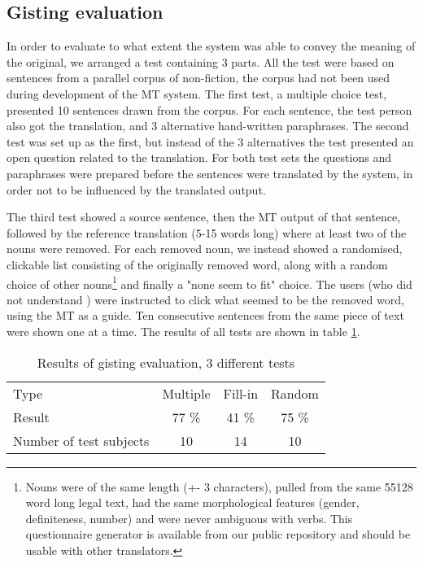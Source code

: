 \documentclass{book}
\begin{document}
\subsection{Gisting evaluation}
  
In order to evaluate to what extent the system was able to convey the
meaning of the original, we arranged a test containing 3 parts. All
the test were based on sentences from a parallel corpus of
non-fiction, the corpus had not been used during development of the MT
system. The first test, a multiple choice test, presented 10 sentences
drawn from the corpus. For each sentence, the test person also got the
translation, and 3 alternative hand-written paraphrases. The second
test was set up as the first, but instead of the 3 alternatives the
test presented an open question related to the translation. For both
test sets the questions and paraphrases were prepared before the
sentences were translated by the system, in order not to be influenced
by the translated output.

The third test showed a \sme{} source sentence, then the MT output of
that sentence, followed by the reference translation (5-15 words long)
where at least two of the nouns were removed. For each removed noun,
we instead showed a randomised, clickable list consisting of the
originally removed word, along with a random choice of other
nouns\footnote{Nouns were of the same length (+- 3 characters), pulled
  from the same 55128 word long legal text, had the same morphological
  features (gender, definiteness, number) and were never ambiguous
  with verbs. This questionnaire generator is available from our
  public repository and should be usable with other translators.} and
finally a "none seem to fit" choice. The users (who did not understand
\sme{}) were instructed to click what seemed to be the removed word,
using the MT as a guide. Ten consecutive sentences from the same piece
of text were shown one at a time. The results of all tests are shown
in table \ref{eval}.

\begin{table}[htdp]
\caption{Results of gisting evaluation, 3 different tests}
\begin{center}
\begin{tabular}{lccc}
Type & Multiple & Fill-in & Random \\
Result & 77 \% & 41 \% & 75 \% \\
Number of test subjects & 10 & 14  & 10  \\
\end{tabular}
\end{center}
\label{eval}
\end{table}%
\end{document}
